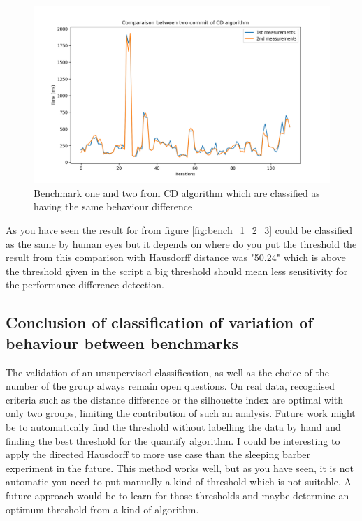 \documentclass{article}
\begin{document}
\begin{figure}[]
    \centering
    \includegraphics[width=1\textwidth]{images/plot_CD_100.56999999999994.png}
    \caption{Benchmark one and two from CD algorithm which are classified as having the same behaviour difference}
    \label{fig:bench_1_2_4}
\end{figure}


As you have seen the result for from figure \ref{fig:bench_1_2_3} could be classified as the same by human eyes but it depends on where do you put the threshold the result from this comparison with Hausdorff distance was "50.24" which is above the threshold given in the script a big threshold should mean less sensitivity for the performance difference detection.\\

\pagebreak
\newpage


\subsection{Conclusion of classification of variation of behaviour between benchmarks}

The validation of an unsupervised classification, as well as the choice of the number of the group always remain open questions. On real data, recognised criteria such as the distance difference or the silhouette index are optimal with only two groups, limiting the contribution of such an analysis.
Future work might be to automatically find the threshold without labelling the data by hand and finding the best threshold for the quantify algorithm.
I could be interesting to apply the directed Hausdorff to more use case than the sleeping barber experiment in the future.
This method works well, but as you have seen, it is not automatic you need to put manually a kind of threshold which is not suitable.
A future approach would be to learn for those thresholds and maybe determine an optimum threshold from a kind of algorithm.
\end{document}
